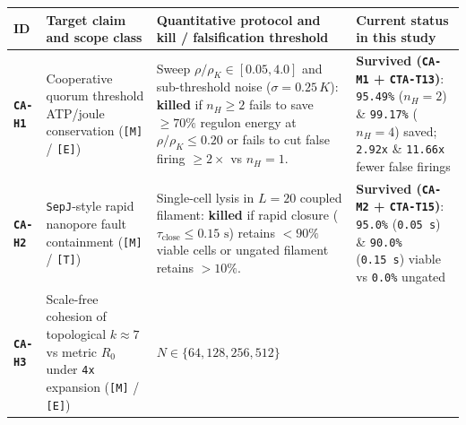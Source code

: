 \documentclass[10pt,letterpaper]{article}
\begin{document}
{\footnotesize\setlength{\tabcolsep}{3.8pt}\renewcommand{\arraystretch}{1.15}
\begin{longtable}[]{@{}
  >{\raggedright\arraybackslash}p{}
  >{\raggedright\arraybackslash}p{}
  >{\raggedright\arraybackslash}p{}
  >{\raggedright\arraybackslash}p{}@{}}
\toprule\noalign{}
\begin{minipage}[b]{\linewidth}\raggedright
\textbf{ID}
\end{minipage} & \begin{minipage}[b]{\linewidth}\raggedright
\textbf{Target claim and scope class}
\end{minipage} & \begin{minipage}[b]{\linewidth}\raggedright
\textbf{Quantitative protocol and kill / falsification threshold}
\end{minipage} & \begin{minipage}[b]{\linewidth}\raggedright
\textbf{Current status in this study}
\end{minipage} \\
\midrule\noalign{}
\endhead
\bottomrule\noalign{}
\endlastfoot
\textbf{\texttt{CA-H1}} & Cooperative quorum threshold ATP/joule
conservation (\texttt{{[}M{]}} / \texttt{{[}E{]}}) & Sweep
\(\rho/\rho_K \in [0.05, 4.0]\) and sub-threshold noise
(\(\sigma = 0.25\,K\)): \textbf{killed} if \(n_H \ge 2\) fails to save
\(\ge 70\%\) regulon energy at \(\rho/\rho_K \le 0.20\) or fails to cut
false firing \(\ge 2\times\) vs \(n_H = 1\). & \textbf{Survived
(\texttt{CA-M1} + \texttt{CTA-T13})}: \texttt{95.49\%} (\(n_H=2\)) \&
\texttt{99.17\%} (\(n_H=4\)) saved; \texttt{2.92x} \& \texttt{11.66x}
fewer false firings \\
\textbf{\texttt{CA-H2}} & \texttt{SepJ}-style rapid nanopore fault
containment (\texttt{{[}M{]}} / \texttt{{[}T{]}}) & Single-cell lysis in
\(L = 20\) coupled filament: \textbf{killed} if rapid closure
(\(\tau_{\text{close}} \le 0.15\text{ s}\)) retains \(< 90\%\) viable
cells or ungated filament retains \(> 10\%\). & \textbf{Survived
(\texttt{CA-M2} + \texttt{CTA-T15})}: \texttt{95.0\%} (\texttt{0.05\ s})
\& \texttt{90.0\%} (\texttt{0.15\ s}) viable vs \texttt{0.0\%}
ungated \\
\textbf{\texttt{CA-H3}} & Scale-free cohesion of topological
\(k \approx 7\) vs metric \(R_0\) under \texttt{4x} expansion
(\texttt{{[}M{]}} / \texttt{{[}E{]}}) & \(N \in \{64, 128, 256, 512\}\)

\end{longtable}}
\end{document}
